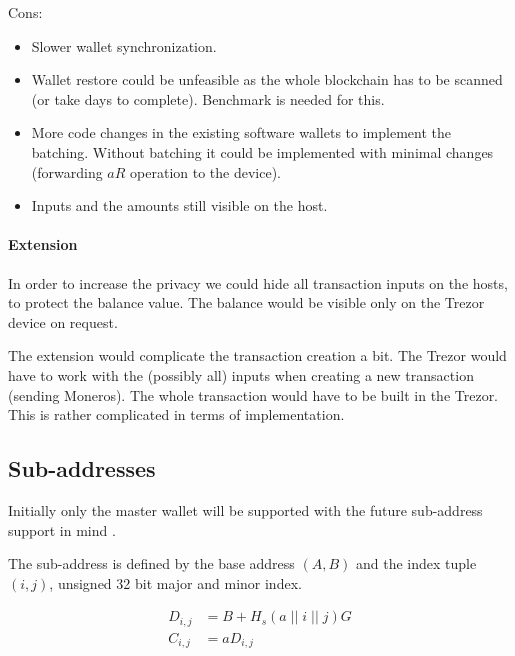 \documentclass[]{article}
\begin{document}
\noindent Cons:
\begin{itemize}
	\item Slower wallet synchronization.
	\item Wallet restore could be unfeasible as the whole blockchain has to be scanned (or take days to complete). Benchmark is needed for this.
	\item More code changes in the existing software wallets to implement the batching. Without batching it could be implemented with minimal changes (forwarding $aR$ operation to the device).
	\item Inputs and the amounts still visible on the host.
\end{itemize}

\paragraph{Extension} In order to increase the privacy we could hide all transaction inputs on the hosts, to protect the balance value. The balance would be visible only on the Trezor device on request.

The extension would complicate the transaction creation a bit. The Trezor would have to work with the (possibly all) inputs when creating a new transaction (sending Moneros). The whole transaction would have to be built in the Trezor. This is rather complicated in terms of implementation. 

\subsection{Sub-addresses}
Initially only the master wallet will be supported with the future sub-address support in mind \cite{mrl_006_subaddr}.

The sub-address is defined by the base address $(A,B)$ and the index tuple $(i,j)$, unsigned 32 bit major and minor index.

\begin{align}
	D_{i,j} &= B + H_s(a \; || \; i \; || \; j)G \\
	C_{i,j} &= aD_{i,j} 
\end{align}
\end{document}
